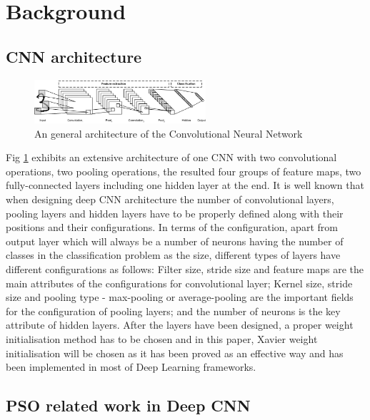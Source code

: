 \documentclass[conference]{IEEEtran}
\begin{document}
\section{Background}\label{sec:Background}

\subsection{CNN architecture}\label{sec:CNNArchitecture}

\begin{figure}[!t]
	\centering
	\includegraphics[width=2.5in]{cnn_architecture}
	\caption{An general architecture of the Convolutional Neural Network}
	\label{fig:CNNArchitecture}
\end{figure}

Fig \ref{fig:CNNArchitecture} exhibits an extensive architecture of one CNN with two convolutional operations, two pooling operations, the resulted four groups of feature maps, two fully-connected layers including one hidden layer at the end. It is well known that when designing deep CNN architecture the number of convolutional layers, pooling layers and hidden layers have to be properly defined along with their positions and their configurations. In terms of the configuration, apart from output layer which will always be a number of neurons having the number of classes in the classification problem as the size, different types of layers have different configurations as follows: Filter size, stride size and feature maps are the main attributes of the configurations for convolutional layer; Kernel size, stride size and pooling type - max-pooling or average-pooling are the important fields for the configuration of pooling layers; and the number of neurons is the key attribute of hidden layers. After the layers have been designed, a proper weight initialisation method has to be chosen and in this paper, Xavier weight initialisation \cite{WeightIniti:Glorot} will be chosen as it has been proved as an effective way and has been implemented in most of Deep Learning frameworks.  


\subsection{PSO related work in Deep CNN}
\end{document}
